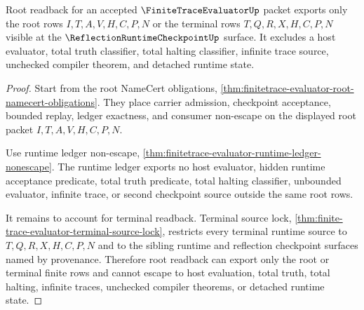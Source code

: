 \begin{theorem}
\label{thm:finitetrace-evaluator-root-readback-nonescape}
Root readback for an accepted $\FiniteTraceEvaluatorUp$ packet exports only
the root rows $I,T,A,V,H,C,P,N$ or the terminal rows $T,Q,R,X,H,C,P,N$ visible
at the $\ReflectionRuntimeCheckpointUp$ surface. It excludes a host evaluator,
total truth classifier, total halting classifier, infinite trace source,
unchecked compiler theorem, and detached runtime state.
\end{theorem}
\begin{proof}
Start from the root NameCert obligations,
\autoref{thm:finitetrace-evaluator-root-namecert-obligations}. They place
carrier admission, checkpoint acceptance, bounded replay, ledger exactness,
and consumer non-escape on the displayed root packet
$I,T,A,V,H,C,P,N$.

Use runtime ledger non-escape,
\autoref{thm:finitetrace-evaluator-runtime-ledger-nonescape}. The runtime
ledger exports no host evaluator, hidden runtime acceptance predicate, total
truth predicate, total halting classifier, unbounded evaluator, infinite trace,
or second checkpoint source outside the same root rows.

It remains to account for terminal readback. Terminal source lock,
\autoref{thm:finite-trace-evaluator-terminal-source-lock}, restricts every
terminal runtime source to $T,Q,R,X,H,C,P,N$ and to the sibling runtime and
reflection checkpoint surfaces named by provenance. Therefore root readback
can export only the root or terminal finite rows and cannot escape to host
evaluation, total truth, total halting, infinite traces, unchecked compiler
theorems, or detached runtime state.
\end{proof}
